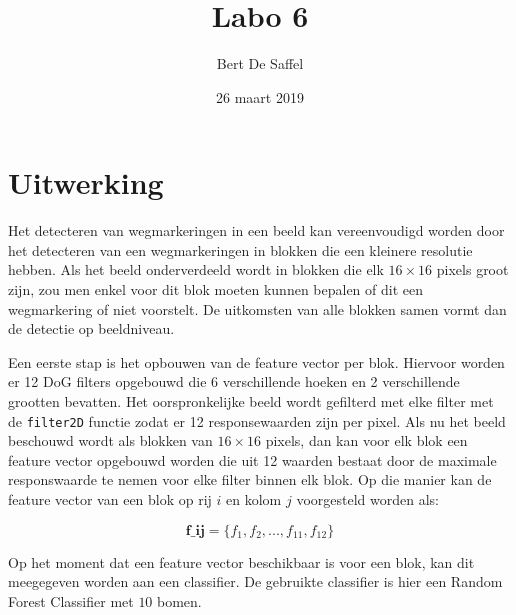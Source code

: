 \documentclass{article}
\begin{document}
	\title{Labo 6}
	\author{Bert De Saffel}
	\date{26 maart 2019}
	\maketitle
	
\section{Uitwerking}
Het detecteren van wegmarkeringen in een beeld kan vereenvoudigd worden door het detecteren van een wegmarkeringen in blokken die een kleinere resolutie hebben. Als het beeld onderverdeeld wordt in blokken die elk $16 \times 16$ pixels groot zijn, zou men enkel voor dit blok moeten kunnen bepalen of dit een wegmarkering of niet voorstelt. De uitkomsten van alle blokken samen vormt dan de detectie op beeldniveau.

Een eerste stap is het opbouwen van de feature vector per blok. Hiervoor worden er 12 DoG filters opgebouwd die 6 verschillende hoeken en 2 verschillende grootten bevatten. Het oorspronkelijke beeld wordt gefilterd met elke filter met de \texttt{filter2D} functie zodat er 12 responsewaarden zijn per pixel. Als nu het beeld beschouwd wordt als blokken van $16 \times 16$ pixels, dan kan voor elk blok een feature vector opgebouwd worden die uit 12 waarden bestaat door de maximale responswaarde te nemen voor elke filter binnen elk blok. Op die manier kan de feature vector van een blok op rij $i$ en kolom $j$ voorgesteld worden als:

$$\textbf{f_{ij}} = \{f_1, f_2, ..., f_{11}, f_{12}\}$$

Op het moment dat een feature vector beschikbaar is voor een blok, kan dit meegegeven worden aan een classifier. De gebruikte classifier is hier een Random Forest Classifier met $10$ bomen.
\end{document}
